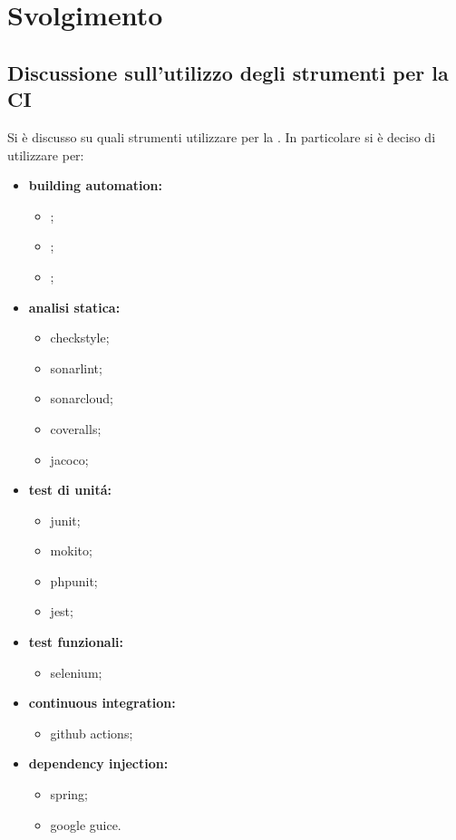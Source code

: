 \newpage
\section*{Svolgimento}

	\subsection*{Discussione sull'utilizzo degli strumenti per la CI}
		Si è discusso su quali strumenti utilizzare per la . In particolare si è deciso di utilizzare per:
		\begin{itemize}
			\item \textbf{building automation: }
				\begin{itemize}
					\item {};
					\item {};
					\item {};
				\end{itemize}
			\item \textbf{analisi statica: }
				\begin{itemize}
					\item checkstyle;
					\item sonarlint;
					\item sonarcloud;
					\item coveralls;
					\item jacoco;
				\end{itemize}
			\item \textbf{test di unitá: }
				\begin{itemize}
					\item junit;
					\item mokito;
					\item phpunit;
					\item jest;
				\end{itemize}
			\item \textbf{test funzionali: }
				\begin{itemize}
					\item selenium;
				\end{itemize}
			\item \textbf{continuous integration: }
				\begin{itemize}
					\item github actions;
				\end{itemize}
			\item \textbf{dependency injection: }
				\begin{itemize}
					\item spring;
					\item google guice.
				\end{itemize}
		\end{itemize}

